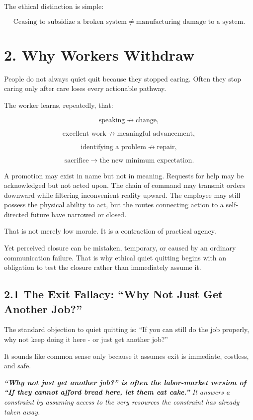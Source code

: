 \documentclass[11pt,oneside]{article}
\renewenvironment{quote}
  {\begin{tcolorbox}[
      enhanced,
      breakable,
      colback=ManifestLight,
      colframe=ManifestRule,
      boxrule=0pt,
      leftrule=3pt,
      arc=0pt,
      outer arc=0pt,
      left=10pt,right=10pt,top=8pt,bottom=8pt,
      before skip=0.8em,after skip=0.8em
    ]\itshape}
  {\end{tcolorbox}}
\begin{document}
The ethical distinction is simple:

\[
\boxed{\text{Ceasing to subsidize a broken system} \neq \text{manufacturing damage to a system}.}
\]

\section{2. Why Workers Withdraw}\label{why-workers-withdraw}

People do not always quiet quit because they stopped caring. Often they
stop caring only after care loses every actionable pathway.

The worker learns, repeatedly, that:

\[
\text{speaking} \nrightarrow \text{change},
\]

\[
\text{excellent work} \nrightarrow \text{meaningful advancement},
\]

\[
\text{identifying a problem} \nrightarrow \text{repair},
\]

\[
\text{sacrifice} \rightarrow \text{the new minimum expectation}.
\]

A promotion may exist in name but not in meaning. Requests for help may
be acknowledged but not acted upon. The chain of command may transmit
orders downward while filtering inconvenient reality upward. The
employee may still possess the physical ability to act, but the routes
connecting action to a self-directed future have narrowed or closed.

That is not merely low morale. It is a contraction of practical agency.

Yet perceived closure can be mistaken, temporary, or caused by an
ordinary communication failure. That is why ethical quiet quitting
begins with an obligation to test the closure rather than immediately
assume it.


\subsection{2.1 The Exit Fallacy: ``Why Not Just Get Another
Job?''}\label{the-exit-fallacy-why-not-just-get-another-job}

The standard objection to quiet quitting is: ``If you can still do the
job properly, why not keep doing it here - or just get another job?''

It sounds like common sense only because it assumes exit is immediate,
costless, and safe.

\begin{quote}
\textbf{``Why not just get another job?'' is often the labor-market
version of ``If they cannot afford bread here, let them eat cake.''} It
answers a constraint by assuming access to the very resources the
constraint has already taken away.
\end{quote}
\end{document}
